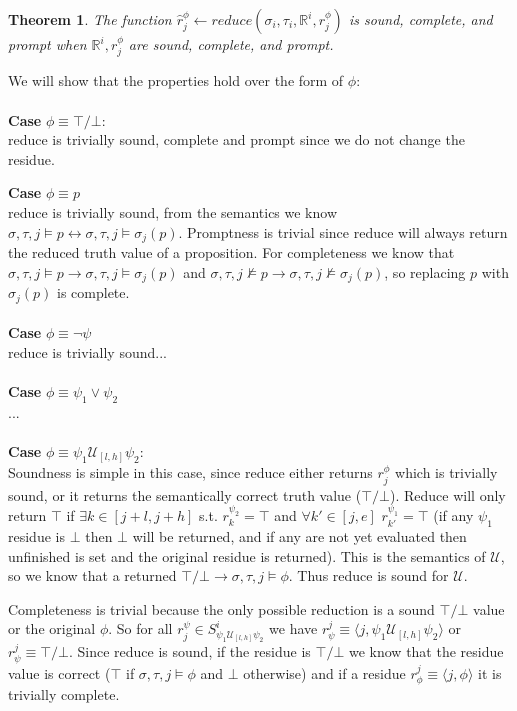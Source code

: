 \documentclass[10pt,a4paper]{article}
\newcommand{\rp}[2]{\ensuremath{\langle #1, #2 \rangle}}
\newcommand{\res}[2]{\ensuremath{r_{#1}^{#2}}}
\newtheorem{thm}{Theorem}
\begin{document}
\begin{thm}
The function $\hat{r}^{\phi}_{j} \leftarrow reduce(\sigma_i, \tau_i, \mathbb{R}^i, \res{j}{\phi})$ is sound, complete, and prompt when $\mathbb{R}^i, \res{j}{\phi}$ are sound, complete, and prompt.
\end{thm}
\noindent We will show that the properties hold over the form of $\phi$: \\
\\ \noindent \textbf{Case} $\phi \equiv \top/\bot$: \\
reduce is trivially sound, complete and prompt since we do not change the residue.

\noindent \textbf{Case} $\phi \equiv p$ \\
reduce is trivially sound, from the semantics we know $\sigma, \tau, j \vDash p \leftrightarrow \sigma, \tau, j \vDash \sigma_j(p)$. Promptness is trivial since reduce will always return the reduced truth value of a proposition.  For completeness we know that $\sigma, \tau, j \vDash p \rightarrow \sigma, \tau, j \vDash \sigma_j(p)$ and $\sigma, \tau, j \nvDash p \rightarrow \sigma, \tau, j \nvDash \sigma_j (p)$, so replacing $p$ with $\sigma_j(p)$ is complete.
\\ \\ 
\noindent \textbf{Case} $\phi \equiv \neg \psi$ \\
reduce is trivially sound...
\\ \\
\noindent \textbf{Case} $\phi \equiv \psi_1 \vee \psi_2$ \\
...
\\ \\
\noindent \textbf{Case} $\phi \equiv \psi_1 \mathcal{U}_{[l,h]} \psi_2$: \\
Soundness is simple in this case, since reduce either returns $\res{j}{\phi}$ which is trivially sound, or it returns the semantically correct truth value ($\top/\bot$). Reduce will only return $\top$ if $\exists k \in [j+l,j+h]$ s.t. $\res{k}{\psi_2} = \top$ and $\forall k' \in [j,e]$ $\res{k'}{\psi_1} = \top$ (if any $\psi_1$ residue is $\bot$ then $\bot$ will be returned, and if any are not yet evaluated then unfinished is set and the original residue is returned). This is the semantics of $\mathcal{U}$, so we know that a returned $\top/\bot \rightarrow \sigma, \tau, j \vDash \phi$. Thus reduce is sound for $\mathcal{U}$.

Completeness is trivial because the only possible reduction is a sound $\top/\bot$ value or the original $\phi$. So for all $\res{j}{\psi} \in S^i_{\psi_1 \mathcal{U}_{[l,h]} \psi_2}$ we have $\res{\psi}{j} \equiv \rp{j}{\psi_1 \mathcal{U}_{[l,h]} \psi_2}$ or $\res{\psi}{j} \equiv \top/\bot$. Since reduce is sound, if the residue is $\top/\bot$ we know that the residue value is correct ($\top$ if $\sigma, \tau, j \vDash \phi$ and $\bot$ otherwise) and if a residue $\res{\phi}{j} \equiv \rp{j}{\phi}$ it is trivially complete.
\end{document}
